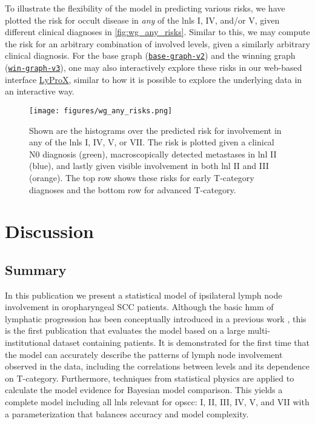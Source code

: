 \documentclass[twocolumn]{aastex631}
\begin{document}
To illustrate the flexibility of the model in predicting various risks, we have plotted the risk for occult disease in \textit{any} of the \glspl{lnl} I, IV, and/or V, given different clinical diagnoses in \autoref{fig:wg_any_risks}. Similar to this, we may compute the risk for an arbitrary combination of involved levels, given a similarly arbitrary clinical diagnosis. For the base graph (\href{https://lyprox.org/riskpredictor/9}{\texttt{base-graph-v2}}) and the winning graph (\href{https://lyprox.org/riskpredictor/8}{\texttt{win-graph-v3}}), one may also interactively explore these risks in our web-based interface \href{https://lyprox.org/riskpredictor/list}{LyProX}, similar to how it is possible to explore the underlying data in an interactive way.

\begin{figure}
    \begin{centering}
        \texttt{[image: figures/wg\_any\_risks.png]}
        \caption{Shown are the histograms over the predicted risk for involvement in any of the \glspl{lnl} I, IV, V, or VII. The risk is plotted given a clinical N0 diagnosis (green), macroscopically detected metastases in \gls{lnl} II (blue), and lastly given visible involvement in both \gls{lnl} II and III (orange). The top row shows these risks for early T-category diagnoses and the bottom row for advanced T-category. \label{fig:wg_any_risks}}
    \end{centering}
\end{figure}


\section{Discussion}
\label{sec:discussion}

\subsection{Summary} 

In this publication we present a statistical model of ipsilateral lymph node involvement in oropharyngeal SCC patients. Although the basic \gls{hmm} of lymphatic progression has been conceptually introduced in a previous work \citep{ludwig_hidden_2021}, this is the first publication that evaluates the model based on a large multi-institutional dataset containing  patients. It is demonstrated for the first time that the model can accurately describe the patterns of lymph node involvement observed in the data, including the correlations between levels and its dependence on T-category. Furthermore, techniques from statistical physics are applied to calculate the model evidence for Bayesian model comparison. This yields a complete model including all \glspl{lnl} relevant for \gls{opscc}: I, II, III, IV, V, and VII with a parameterization that balances accuracy and model complexity. 
\end{document}
